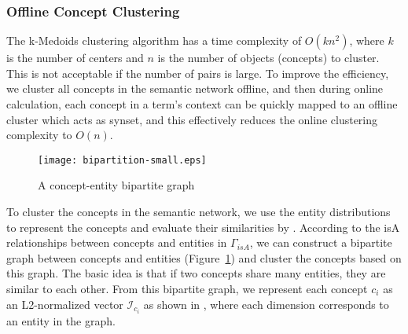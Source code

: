 \subsubsection{Offline Concept Clustering}
The k-Medoids clustering algorithm has a time complexity of $O(kn^{2})$,
where $k$ is the number of centers and $n$ is the number of objects (concepts)
to cluster.
This is not acceptable if the number of pairs is large.
To improve the efficiency, we cluster all concepts
in the semantic network offline, and then during online calculation,
each concept in a term's context can be quickly mapped to an offline cluster
which acts as synset, and this effectively reduces the online clustering
complexity to $O(n)$.

\begin{figure}[th]
 \centerline{
 \texttt{[image: bipartition-small.eps]}}
\caption{A concept-entity bipartite graph} \label{fig:bipartition}
\end{figure}

To cluster the concepts in the semantic network, we use the entity distributions to represent the concepts and evaluate their similarities by . According to the isA relationships between concepts and entities in $\Gamma_{isA}$, we can construct a bipartite graph
between concepts and entities (Figure~\ref{fig:bipartition}) and cluster the concepts based on this graph. The basic idea is that if two
concepts share many entities, they are similar to each other. From this bipartite graph, we represent each concept $c_i$ as an L2-normalized
vector $\mathcal{I}_{c_i}$ as shown in , where each dimension corresponds to an entity in the graph.

